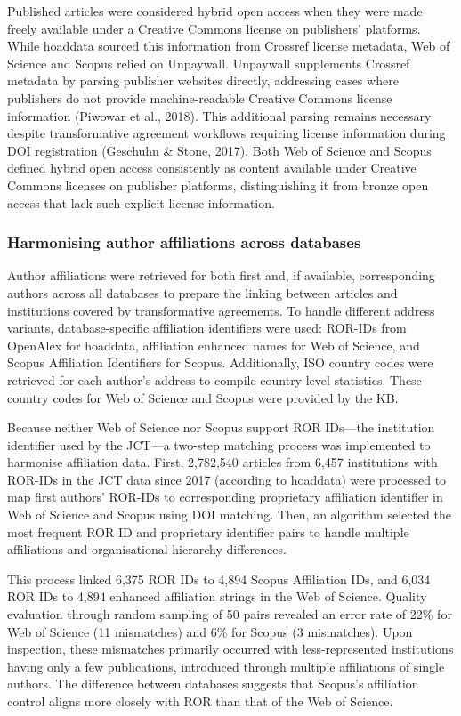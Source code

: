 \documentclass[a4paper,man,floatsintext,longtable,noextraspace,10pt]{apa6}
\begin{document}
Published articles were considered hybrid open access when they were
made freely available under a Creative Commons license on publishers'
platforms. While hoaddata sourced this information from Crossref license
metadata, Web of Science and Scopus relied on Unpaywall. Unpaywall
supplements Crossref metadata by parsing publisher websites directly,
addressing cases where publishers do not provide machine-readable
Creative Commons license information (Piwowar et al., 2018). This
additional parsing remains necessary despite transformative agreement
workflows requiring license information during DOI registration
(Geschuhn \& Stone, 2017). Both Web of Science and Scopus defined hybrid
open access consistently as content available under Creative Commons
licenses on publisher platforms, distinguishing it from bronze open
access that lack such explicit license information.

\subsubsection{Harmonising author affiliations across
databases}\label{harmonising-author-affiliations-across-databases}

Author affiliations were retrieved for both first and, if available,
corresponding authors across all databases to prepare the linking
between articles and institutions covered by transformative agreements.
To handle different address variants, database-specific affiliation
identifiers were used: ROR-IDs from OpenAlex for hoaddata, affiliation
enhanced names for Web of Science, and Scopus Affiliation Identifiers
for Scopus. Additionally, ISO country codes were retrieved for each
author's address to compile country-level statistics. These country
codes for Web of Science and Scopus were provided by the KB.

Because neither Web of Science nor Scopus support ROR IDs---the
institution identifier used by the JCT---a two-step matching process was
implemented to harmonise affiliation data. First, 2,782,540 articles
from 6,457 institutions with ROR-IDs in the JCT data since 2017
(according to hoaddata) were processed to map first authors' ROR-IDs to
corresponding proprietary affiliation identifier in Web of Science and
Scopus using DOI matching. Then, an algorithm selected the most frequent
ROR ID and proprietary identifier pairs to handle multiple affiliations
and organisational hierarchy differences.

This process linked 6,375 ROR IDs to 4,894 Scopus Affiliation IDs, and
6,034 ROR IDs to 4,894 enhanced affiliation strings in the Web of
Science. Quality evaluation through random sampling of 50 pairs revealed
an error rate of 22\% for Web of Science (11 mismatches) and 6\% for
Scopus (3 mismatches). Upon inspection, these mismatches primarily
occurred with less-represented institutions having only a few
publications, introduced through multiple affiliations of single
authors. The difference between databases suggests that Scopus's
affiliation control aligns more closely with ROR than that of the Web of
Science.
\end{document}
